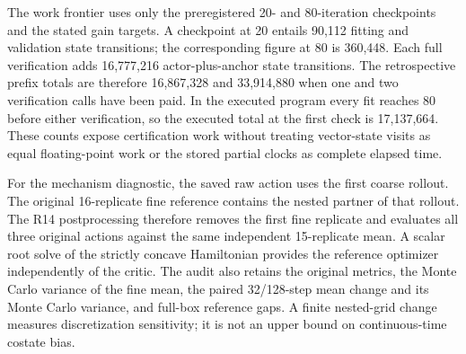 The work frontier uses only the preregistered 20- and 80-iteration checkpoints and the stated gain targets. A checkpoint at 20 entails 90,112 fitting and validation state transitions; the corresponding figure at 80 is 360,448. Each full verification adds 16,777,216 actor-plus-anchor state transitions. The retrospective prefix totals are therefore 16,867,328 and 33,914,880 when one and two verification calls have been paid. In the executed program every fit reaches 80 before either verification, so the executed total at the first check is 17,137,664. These counts expose certification work without treating vector-state visits as equal floating-point work or the stored partial clocks as complete elapsed time.

For the mechanism diagnostic, the saved raw action uses the first coarse rollout. The original 16-replicate fine reference contains the nested partner of that rollout. The R14 postprocessing therefore removes the first fine replicate and evaluates all three original actions against the same independent 15-replicate mean. A scalar root solve of the strictly concave Hamiltonian provides the reference optimizer independently of the critic. The audit also retains the original metrics, the Monte Carlo variance of the fine mean, the paired 32/128-step mean change and its Monte Carlo variance, and full-box reference gaps. A finite nested-grid change measures discretization sensitivity; it is not an upper bound on continuous-time costate bias.
